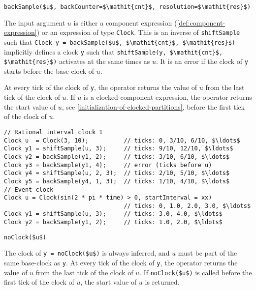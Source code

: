 \begin{operatordefinition}[backSample]
\begin{synopsis}\begin{lstlisting}
backSample($u$, backCounter=$\mathit{cnt}$, resolution=$\mathit{res}$)
\end{lstlisting}\end{synopsis}
\begin{semantics}
The input argument $u$ is either a component expression (\cref{def:component-expression}) or an expression of type \lstinline!Clock!.
This is an inverse of \lstinline!shiftSample! such that \lstinline!Clock y = backSample($u$, $\mathit{cnt}$, $\mathit{res}$)! implicitly defines a clock \lstinline!y! such that \lstinline!shiftSample(y, $\mathit{cnt}$, $\mathit{res}$)! activates at the same times as $u$.
It is an error if the clock of \lstinline!y! starts before the base-clock of $u$.

At every tick of the clock of \lstinline!y!, the operator returns the value of $u$ from the last tick of the clock of $u$.
If $u$ is a clocked component expression, the operator returns the start value of $u$, see \cref{initialization-of-clocked-partitions}, before the first tick of the clock of $u$.

\begin{example}
\begin{lstlisting}[language=modelica]
// Rational interval clock 1
Clock u  = Clock(3, 10);          // ticks: 0, 3/10, 6/10, $\ldots$
Clock y1 = shiftSample(u, 3);     // ticks: 9/10, 12/10, $\ldots$
Clock y2 = backSample(y1, 2);     // ticks: 3/10, 6/10, $\ldots$
Clock y3 = backSample(y1, 4);     // error (ticks before u)
Clock y4 = shiftSample(u, 2, 3);  // ticks: 2/10, 5/10, $\ldots$
Clock y5 = backSample(y4, 1, 3);  // ticks: 1/10, 4/10, $\ldots$
// Event clock
Clock u = Clock(sin(2 * pi * time) > 0, startInterval = xx)
                                  // ticks: 0, 1.0, 2.0, 3.0, $\ldots$
Clock y1 = shiftSample(u, 3);     // ticks: 3.0, 4.0, $\ldots$
Clock y2 = backSample(y1, 2);     // ticks: 1.0, 2.0, $\ldots$
\end{lstlisting}
\end{example}
\end{semantics}
\end{operatordefinition}

\begin{operatordefinition}[noClock]
\begin{synopsis}\begin{lstlisting}
noClock($u$)
\end{lstlisting}\end{synopsis}
\begin{semantics}
The clock of \lstinline!y = noClock($u$)! is always inferred, and $u$ must be part of the same base-clock as \lstinline!y!.  At every tick of the clock of \lstinline!y!, the operator returns the value of $u$ from the last tick of the clock of $u$.  If \lstinline!noClock($u$)! is called before the first tick of the clock of $u$, the start value of $u$ is returned.
\end{semantics}
\end{operatordefinition}

